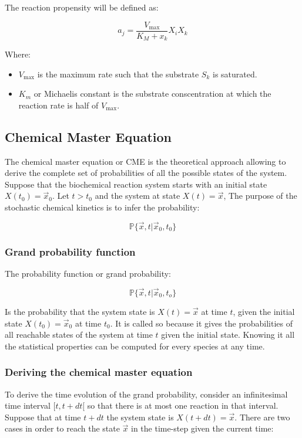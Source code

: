       The reaction propensity will be defined as:

      $$a_j = \frac{V_{\max}}{K_M+x_k}X_iX_k$$

      Where:

      \begin{multicols}{2}
        \begin{itemize}
          \item $V_{\max}$ is the maximum rate such that the substrate $S_k$ is saturated.
          \item  $K_m$  or Michaelis constant is the substrate conscentration at which the reaction rate is half of $V_{\max}$.
        \end{itemize}
      \end{multicols}

  \subsection{Chemical Master Equation}
  The chemical master equation or CME is the theoretical approach allowing to derive the complete set of probabilities of all the possible states of the system.
  Suppose that the biochemical reaction system starts with an initial state $X(t_0) = \vec{x}_0$.
  Let $t>t_0$ and the system at state $X(t)=\vec{x}$,
  The purpose of the stochastic chemical kinetics is to infer the probability:

  $$\mathbb{P}\{\vec{x},t|\vec{x}_0, t_0\}$$

    \subsubsection{Grand probability function}
    The probability function or grand probability:

    $$\mathbb{P}\{\vec{x},t|\vec{x}_0,t_o\}$$

    Is the probability that the system state is $X(t) = \vec{x}$ at time $t$, given the initial state $X(t_0) = \vec{x}_0$ at time $t_0$.
    It is called so because it gives the probabilities of all reachable states of the system at time $t$ given the initial state.
    Knowing it all the statistical properties can be computed for every species at any time.

    \subsubsection{Deriving the chemical master equation}
    To derive the time evolution of the grand probability, consider an infinitesimal time interval $[t, t+ dt[$ so that there is at most one reaction in that interval.
    Suppose that at time $t+dt$ the system state is $X(t+dt) = \vec{x}$.
    There are two cases in order to reach the state $\vec{x}$ in the time-step given the current time:

